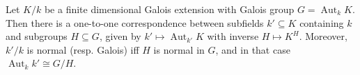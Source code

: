 Let $K/k$ be a finite dimensional Galois extension with Galois group $G = \operatorname{Aut}_k K$. Then there is a one-to-one correspondence between subfields $k' \subseteq K$ containing $k$ and subgroups $H \subseteq G$, given by $k' \mapsto \operatorname{Aut}_{k'} K$ with inverse $H \mapsto K^H$. Moreover, $k'/k$ is normal (resp. Galois) iff $H$ is normal in $G$, and in that case $\operatorname{Aut}_k k' \cong G/H$.

